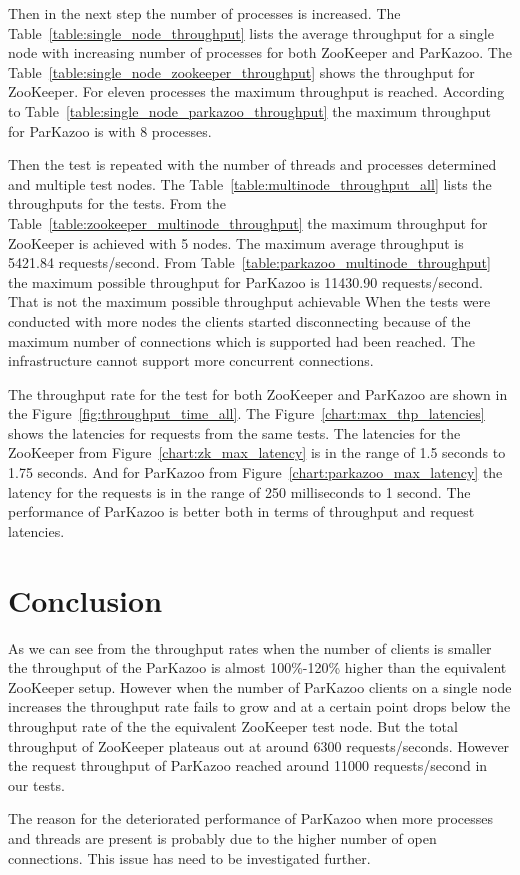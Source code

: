 

Then in the next step the number of processes is increased. The Table~\ref{table:single_node_throughput} lists the average throughput for a single node with increasing number of processes for both ZooKeeper and ParKazoo. The Table~\ref{table:single_node_zookeeper_throughput} shows the throughput for ZooKeeper. For eleven processes the maximum throughput is reached. According to Table~\ref{table:single_node_parkazoo_throughput} the maximum throughput for ParKazoo is with 8 processes.

Then the test is repeated with the number of threads and processes determined and multiple test nodes. The Table~\ref{table:multinode_throughput_all} lists the throughputs for the tests. From the Table~\ref{table:zookeeper_multinode_throughput} the maximum throughput for ZooKeeper is achieved with 5 nodes. The maximum average throughput is 5421.84 requests/second. From Table~\ref{table:parkazoo_multinode_throughput} the maximum possible throughput for ParKazoo is 11430.90 requests/second. That is not the maximum possible throughput achievable When the tests were conducted with more nodes the clients started disconnecting because of the maximum number of connections which is supported had been reached. The infrastructure cannot support more concurrent connections.



The throughput rate for the test for both ZooKeeper and ParKazoo are shown in the Figure~\ref{fig:throughput_time_all}. The Figure~\ref{chart:max_thp_latencies} shows the latencies for requests from the same tests. The latencies for the ZooKeeper from Figure~\ref{chart:zk_max_latency} is in the range of 1.5 seconds to 1.75 seconds. And for ParKazoo from Figure~\ref{chart:parkazoo_max_latency} the latency for the requests is in the range of 250 milliseconds to 1 second. The performance of ParKazoo is better both in terms of throughput and request latencies.




\section{Conclusion}
As we can see from the throughput rates when the number of clients is smaller the throughput of the ParKazoo is almost 100\%-120\% higher than the equivalent ZooKeeper setup. However when the number of ParKazoo clients on a single node increases the throughput rate fails to grow and at a certain point drops below the throughput rate of the the equivalent ZooKeeper test node. But the total throughput of ZooKeeper plateaus out at around 6300 requests/seconds. However the request throughput of ParKazoo reached around 11000 requests/second in our tests.

The reason for the deteriorated performance of ParKazoo when more processes and threads are present is probably due to the higher number of open connections. This issue has need to be investigated further. 
